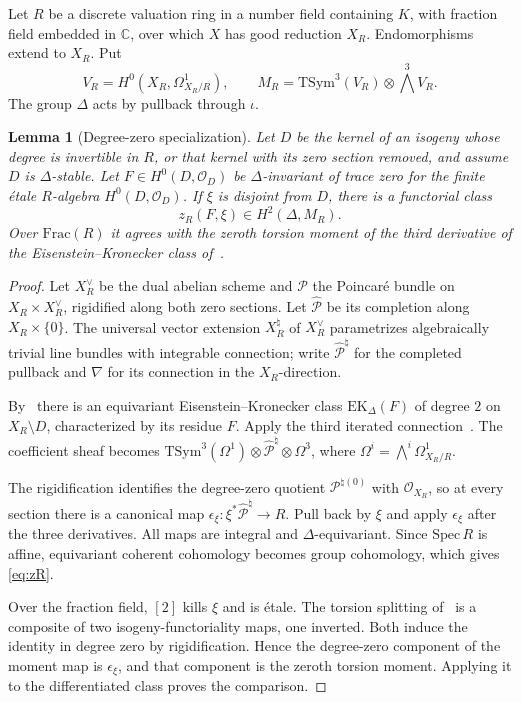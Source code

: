 \documentclass[11pt]{amsart}
\newtheorem{lemma}[theorem]{Lemma}
\theoremstyle{remark}
\theoremstyle{definition}
\newcommand{\C}{\mathbb{C}}
\newcommand{\TSym}{\mathrm{TSym}}
\begin{document}
Let $R$ be a discrete valuation ring in a number field containing $K$, with fraction field embedded in $\C$, over which $X$ has good reduction $X_R$. Endomorphisms extend to $X_R$. Put
\[
V_R=H^0(X_R,\Omega^1_{X_R/R}),\qquad M_R=\TSym^3(V_R)\otimes{\textstyle\bigwedge^3}V_R .
\]
The group $\Delta$ acts by pullback through $\iota$.

\begin{lemma}[Degree-zero specialization]\label{lem:deg0}
Let $D$ be the kernel of an isogeny whose degree is invertible in $R$, or that kernel with its zero section removed, and assume $D$ is $\Delta$-stable. Let $F\in H^0(D,\mathcal O_D)$ be $\Delta$-invariant of trace zero for the finite \'etale $R$-algebra $H^0(D,\mathcal O_D)$. If $\xi$ is disjoint from $D$, there is a functorial class
\begin{equation}\label{eq:zR}
z_R(F,\xi)\in H^2(\Delta,M_R).
\end{equation}
Over $\mathrm{Frac}(R)$ it agrees with the zeroth torsion moment of the third derivative of the Eisenstein--Kronecker class of~\cite{KS}.
\end{lemma}

\begin{proof}
Let $X_R^\vee$ be the dual abelian scheme and $\mathcal P$ the Poincar\'e bundle on $X_R\times X_R^\vee$, rigidified along both zero sections. Let $\widehat{\mathcal P}$ be its completion along $X_R\times\{0\}$. The universal vector extension $X_R^{\natural}$ of $X_R^\vee$ parametrizes algebraically trivial line bundles with integrable connection; write $\widehat{\mathcal P}^\natural$ for the completed pullback and $\nabla$ for its connection in the $X_R$-direction.

By~\cite[\S2.3, Thm.~2.20]{KS} there is an equivariant Eisenstein--Kronecker class $\mathrm{EK}_\Delta(F)$ of degree $2$ on $X_R\setminus D$, characterized by its residue $F$. Apply the third iterated connection~\cite[Def.~2.23]{KS}. The coefficient sheaf becomes $\TSym^3(\Omega^1)\otimes\widehat{\mathcal P}^\natural\otimes\Omega^3$, where $\Omega^i=\bigwedge^i\Omega^1_{X_R/R}$.

The rigidification identifies the degree-zero quotient $\mathcal P^{\natural(0)}$ with $\mathcal O_{X_R}$, so at every section there is a canonical map $\epsilon_\xi\colon\xi^*\widehat{\mathcal P}^\natural\to R$. Pull back by $\xi$ and apply $\epsilon_\xi$ after the three derivatives. All maps are integral and $\Delta$-equivariant. Since $\mathrm{Spec}\,R$ is affine, equivariant coherent cohomology becomes group cohomology, which gives \eqref{eq:zR}.

Over the fraction field, $[2]$ kills $\xi$ and is \'etale. The torsion splitting of~\cite[Cor.~2.9]{KS} is a composite of two isogeny-functoriality maps, one inverted. Both induce the identity in degree zero by rigidification. Hence the degree-zero component of the moment map is $\epsilon_\xi$, and that component is the zeroth torsion moment. Applying it to the differentiated class proves the comparison.
\end{proof}
\end{document}
